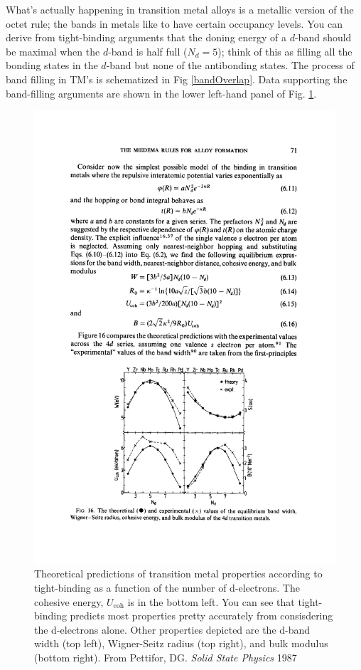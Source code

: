 \documentclass[12pt]{article}
\begin{document}
What's actually happening in transition metal alloys is a metallic version of the octet rule; the bands in metals like to have certain occupancy levels. You can derive from tight-binding arguments that the doning energy of a $d$-band should be maximal when the $d$-band is half full ($N_d=5$); think of this as filling all the bonding states in the $d$-band but none of the antibonding states. The process of band filling in TM's is schematized in Fig \ref{bandOverlap}. Data supporting the band-filling arguments are shown in the lower left-hand panel of Fig. \ref{cohesion_in_TMs}.

\begin{figure}[h]
\centering
\includegraphics[width=13cm]{cohesion_in_TMs_pettifor_1987}
\caption{Theoretical predictions of transition metal properties according to tight-binding as a function of the number of d-electrons. The cohesive energy, $U_{\text{coh}}$ is in the bottom left. You can see that tight-binding predicts most properties pretty accurately from consisdering the d-electrons alone. Other properties depicted are the d-band width (top left), Wigner-Seitz radius (top right), and bulk modulus (bottom right). From Pettifor, DG. \textit{Solid State Physics} 1987}
\label{cohesion_in_TMs}
\end{figure}
\end{document}
